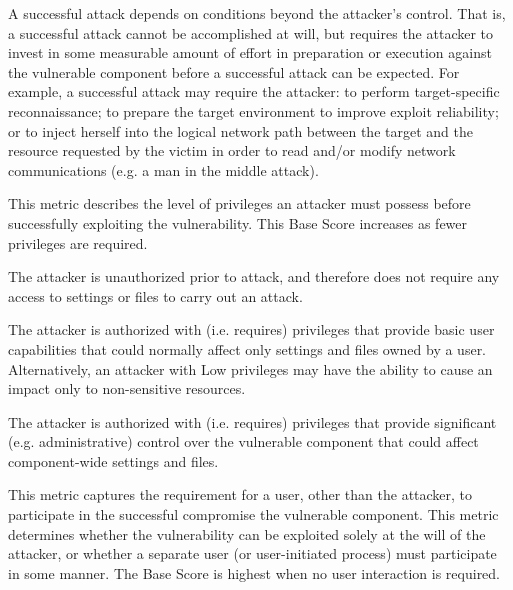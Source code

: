\begin{description}[itemsep=1em,align=left]
\begin{description}[noitemsep,align=left]
                \item [High:] A successful attack depends on conditions beyond the attacker's control. 
                    That is, a successful attack cannot be accomplished at will, but requires the attacker to invest in some measurable amount of effort in preparation or execution against the vulnerable component before a successful attack can be expected. 
                        For example, a successful attack may require the attacker: to perform target-specific reconnaissance; to prepare the target environment to improve exploit reliability; or to inject herself into the logical network path between the target and the resource requested by the victim in order to read and/or modify network communications (e.g. a man in the middle attack).
            \end{description}
        \item [Privileges Required:] This metric describes the level of privileges an attacker must possess before successfully exploiting the vulnerability. 
            This Base Score increases as fewer privileges are required.
            \begin{description}[noitemsep,align=left]
                \item [None:] The attacker is unauthorized prior to attack, and therefore does not require any access to settings or files to carry out an attack.
                \item [Low:] The attacker is authorized with (i.e. requires) privileges that provide basic user capabilities that could normally affect only settings and files owned by a user. 
                    Alternatively, an attacker with Low privileges may have the ability to cause an impact only to non-sensitive resources.
                \item [High:] The attacker is authorized with (i.e. requires) privileges that provide significant (e.g. administrative) control over the vulnerable component that could affect component-wide settings and files.
            \end{description}
        \item [User Interaction:] This metric captures the requirement for a user, other than the attacker, to participate in the successful compromise the vulnerable component. 
            This metric determines whether the vulnerability can be exploited solely at the will of the attacker, or whether a separate user (or user-initiated process) must participate in some manner. 
            The Base Score is highest when no user interaction is required.

\end{description}
